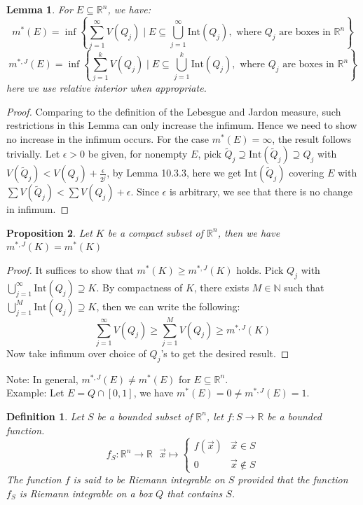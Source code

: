 \documentclass[15pt]{book}
\theoremstyle{break}
\theoremstyle{break}
\newtheorem{lem}{Lemma}[thm]
\newtheorem{prop}[lem]{Proposition}
\newtheorem{defn}{Definition}[corL]
\newcommand{\R}{\mathbb{R}}
\newcommand{\N}{\mathbb{N}}
\newcommand{\Int}{\text{Int}}
\newcommand{\note}{\color{red}Note: \color{black}}
\newcommand{\example}{\color{green}Example: \color{black}}
\begin{document}
\begin{lem}
For $E \subseteq \R^n$, we have: 
$$m^*(E) = \inf\left\{\sum_{j=1}^\infty V(Q_j) \mid E \subseteq \bigcup_{j=1}^\infty \text{Int}(Q_j) , \text{ where } Q_j \text{ are boxes in }\R^n \right\}$$
$$m^{*,J}(E) = \inf\left\{\sum_{j=1}^k V(Q_j) \mid E \subseteq \bigcup_{j=1}^k \text{Int}(Q_j ), \text{ where } Q_j \text{ are boxes in }\R^n\right\} $$
here we use relative interior when appropriate. 
\end{lem}
\begin{proof}
Comparing to the definition of the Lebesgue and Jardon measure, such restrictions in this Lemma can only increase the infimum. Hence we need to show no increase in the infimum occurs. For the case $m^*(E) = \infty$, the result follows trivially. Let $\epsilon>0$ be given, for nonempty $E$, pick $\widetilde{Q}_j \supseteq \text{Int}(\widetilde{Q}_j) \supseteq Q_j$ with $V(\widetilde{Q}_j) < V(Q_j) + \frac{\epsilon}{2^j}$, by Lemma 10.3.3, here we get $\text{Int}(\widetilde{Q}_j)$ covering $E$ with $\sum V(\widetilde{Q}_j) < \sum V(Q_j) + \epsilon$. Since $\epsilon$ is arbitrary, we see that there is no change in infimum. 
\end{proof}
\newpage

\begin{prop}
Let $K$ be a compact subset of $\R^n$, then we have $m^{*,J}(K) = m^*(K)$
\end{prop}
\begin{proof}
It suffices to show that $m^*(K) \geq m^{*,J}(K)$ holds. Pick $Q_j$ with $\bigcup_{j=1}^\infty \text{Int}(Q_j) \supseteq K$. By compactness of $K$, there exists $M \in \N$ such that $\bigcup_{j=1}^M \Int(Q_j) \supseteq K$, then we can write the following:
$$\sum_{j=1}^\infty V(Q_j) \geq \sum_{j=1}^M V(Q_j) \geq m^{*,J}(K)$$
Now take infimum over choice of $Q_j$'s to get the desired result.
\end{proof}


\note In general, $m^{*,J}(E) \neq m^{*} (E)$ for $E \subseteq \R^n$.\\
\example Let $E = Q \cap [0,1]$, we have $m^*(E) = 0 \neq m^{*,J}(E) = 1$. 



\begin{defn}
Let $S$ be a bounded subset of $\R^n$, let $f:S \to \R$ be a bounded function. $$f_S: \R^n \to \R \ \ \ \vec{x}\mapsto\begin{cases} f(\vec{x}) & \vec{x}\in S \\ 0 & \vec{x}\notin S\end{cases}$$ 
The function $f$ is said to be Riemann integrable on $S$ provided that the function $f_S$ is Riemann integrable on a box $Q$ that contains $S$. 
\end{defn}
\end{document}
